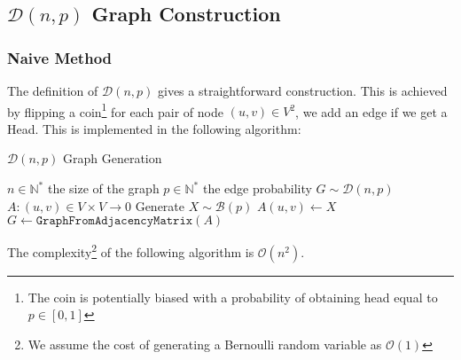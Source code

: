 \subsection{$\mathcal{D}(n,p)$ Graph Construction}

\subsubsection{Naive Method}
The definition of $\mathcal{D}(n,p)$ gives a straightforward construction. \newline
This is achieved by flipping a coin\footnote{The coin is potentially biased with a probability of obtaining head equal to $p\in [0,1]$} for each pair of node $(u,v)\in V^2$, we add an edge if we get a Head. 
\newline This is implemented in the following algorithm:
\begin{algorithm}
	\caption{$\mathcal{D}(n,p)$ Graph Generation}\label{alg:Dnp_Naive}
	\begin{algorithmic}
		\Require $n\in\mathbb{N}^*$ the size of the graph
		\Require $p\in\mathbb{N}^*$ the edge probability 
		\Ensure $G\sim \mathcal{D}(n,p)$  
		\State $A:(u,v)\in V\times V\rightarrow 0$
		\State Generate $X\sim \mathcal{B}(p)$
		\State $A(u,v)\leftarrow X$
		\EndFor
		\EndFor
		\State \Return $G\leftarrow \texttt{GraphFromAdjacencyMatrix}(A)$
	\end{algorithmic}
\end{algorithm}
\FloatBarrier
The complexity\footnote{We assume the cost of generating a Bernoulli random variable as $\mathcal{O}(1)$} of the following algorithm is $\mathcal{O}(n^2).$
